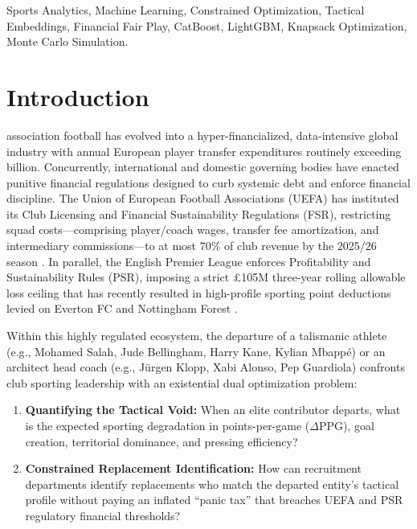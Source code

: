 \documentclass[10pt,journal,compsoc]{IEEEtran}
\begin{document}
{\begin{IEEEkeywords}
Sports Analytics, Machine Learning, Constrained Optimization, Tactical Embeddings, Financial Fair Play, CatBoost, LightGBM, Knapsack Optimization, Monte Carlo Simulation.
\end{IEEEkeywords}}

\maketitle
\IEEEdisplaynontitleabstractindextext
\IEEEpeerreviewmaketitle

\section{Introduction}
 association football has evolved into a hyper-financialized, data-intensive global industry with annual European player transfer expenditures routinely exceeding  billion. Concurrently, international and domestic governing bodies have enacted punitive financial regulations designed to curb systemic debt and enforce financial discipline. The Union of European Football Associations (UEFA) has instituted its Club Licensing and Financial Sustainability Regulations (FSR), restricting squad costs—comprising player/coach wages, transfer fee amortization, and intermediary commissions—to at most 70\% of club revenue by the 2025/26 season \cite{uefa2022club}. In parallel, the English Premier League enforces Profitability and Sustainability Rules (PSR), imposing a strict \pounds105M three-year rolling allowable loss ceiling that has recently resulted in high-profile sporting point deductions levied on Everton FC and Nottingham Forest \cite{premierleague2023handbook}.

Within this highly regulated ecosystem, the departure of a talismanic athlete (e.g., Mohamed Salah, Jude Bellingham, Harry Kane, Kylian Mbapp{\'e}) or an architect head coach (e.g., J{\"u}rgen Klopp, Xabi Alonso, Pep Guardiola) confronts club sporting leadership with an existential dual optimization problem:
\begin{enumerate}
    \item \textbf{Quantifying the Tactical Void:} When an elite contributor departs, what is the expected sporting degradation in points-per-game ($\Delta\text{PPG}$), goal creation, territorial dominance, and pressing efficiency?
    \item \textbf{Constrained Replacement Identification:} How can recruitment departments identify replacements who match the departed entity's tactical profile without paying an inflated ``panic tax'' that breaches UEFA and PSR regulatory financial thresholds?
\end{enumerate}
\end{document}
